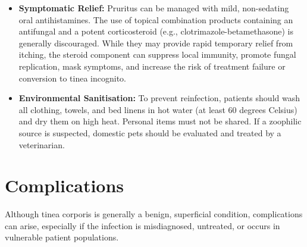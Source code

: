 \begin{itemize}
\begin{itemize}
        \item \textit{Itraconazole:} Given at 100 to 200 mg daily for 1 to 2 weeks. It is a broad-spectrum triazole that requires gastric acidity for optimal absorption.
        \item \textit{Fluconazole:} Typically dosed at 150 mg to 200 mg once weekly for 2 to 4 weeks.
        \item \textit{Griseofulvin:} Historically common, but now largely superseded by newer agents due to longer treatment courses (4 to 6 weeks) and higher rates of side effects and drug interactions.
    \end{itemize}
    \item \textbf{Symptomatic Relief:} Pruritus can be managed with mild, non-sedating oral antihistamines. The use of topical combination products containing an antifungal and a potent corticosteroid (e.g., clotrimazole-betamethasone) is generally discouraged. While they may provide rapid temporary relief from itching, the steroid component can suppress local immunity, promote fungal replication, mask symptoms, and increase the risk of treatment failure or conversion to tinea incognito.
    \item \textbf{Environmental Sanitisation:} To prevent reinfection, patients should wash all clothing, towels, and bed linens in hot water (at least 60 degrees Celsius) and dry them on high heat. Personal items must not be shared. If a zoophilic source is suspected, domestic pets should be evaluated and treated by a veterinarian.
\end{itemize}

\section*{Complications}
Although tinea corporis is generally a benign, superficial condition, complications can arise, especially if the infection is misdiagnosed, untreated, or occurs in vulnerable patient populations.

